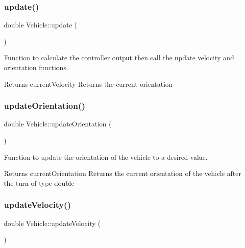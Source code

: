 \subsubsection{\texorpdfstring{update()}{update()}}
{\footnotesize\ttfamily double Vehicle\+::update (\begin{DoxyParamCaption}{ }\end{DoxyParamCaption})}



Function to calculate the controller output then call the update velocity and orientation functions. 

\begin{DoxyReturn}{Returns}
current\+Velocity Returns the current orientation 
\end{DoxyReturn}
\mbox{\label{classVehicle_aea71584dd54c085afb5c10250d393cd9}} 
\subsubsection{\texorpdfstring{update\+Orientation()}{updateOrientation()}}
{\footnotesize\ttfamily double Vehicle\+::update\+Orientation (\begin{DoxyParamCaption}{ }\end{DoxyParamCaption})}



Function to update the orientation of the vehicle to a desired value. 

\begin{DoxyReturn}{Returns}
current\+Orientation Returns the current orientation of the vehicle after the turn of type double 
\end{DoxyReturn}
\mbox{\label{classVehicle_a6575495307173c35f263c09563d8ad4d}} 
\subsubsection{\texorpdfstring{update\+Velocity()}{updateVelocity()}}
{\footnotesize\ttfamily double Vehicle\+::update\+Velocity (\begin{DoxyParamCaption}{ }\end{DoxyParamCaption})}



